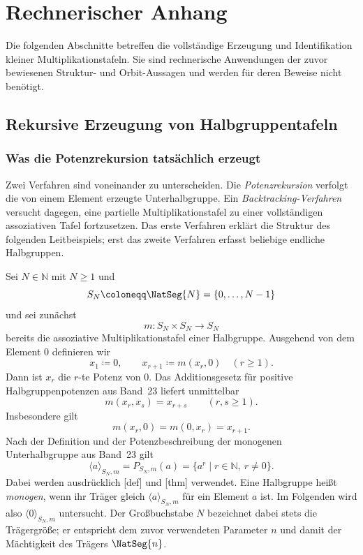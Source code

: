\documentclass[main.tex]{subfiles}
\begin{document}
\chapter{Rechnerischer Anhang}

Die folgenden Abschnitte betreffen die vollständige Erzeugung und
Identifikation kleiner Multiplikationstafeln.  Sie sind rechnerische
Anwendungen der zuvor bewiesenen Struktur- und Orbit-Aussagen und werden
für deren Beweise nicht benötigt.

\section{Rekursive Erzeugung von Halbgruppentafeln}

\subsection{Was die Potenzrekursion tatsächlich erzeugt}

Zwei Verfahren sind voneinander zu unterscheiden.  Die
\emph{Potenzrekursion} verfolgt die von einem Element erzeugte
Unterhalbgruppe.  Ein \emph{Backtracking-Verfahren} versucht dagegen, eine
partielle Multiplikationstafel zu einer vollständigen assoziativen Tafel
fortzusetzen.  Das erste Verfahren erklärt die Struktur des folgenden
Leitbeispiels; erst das zweite Verfahren erfasst beliebige endliche
Halbgruppen.

Sei \(N\in\mathbb N\) mit \(N\geq1\) und
\[
  S_N\coloneqq\NatSeg{N}=\{0,\ldots,N-1\}
\]
und sei zunächst
\[
  m\colon S_N\times S_N\to S_N
\]
bereits die assoziative Multiplikationstafel einer Halbgruppe.  Ausgehend von
dem Element \(0\) definieren wir
\[
  x_1\coloneqq0,
  \qquad
  x_{r+1}\coloneqq m(x_r,0)
  \quad(r\geq1).
\]
Dann ist \(x_r\) die \(r\)-te Potenz von \(0\).  Das Additionsgesetz für
positive Halbgruppenpotenzen aus Band~23 liefert unmittelbar
\[
  \boxed{m(x_r,x_s)=x_{r+s}}
  \qquad(r,s\geq1).
\]
Insbesondere gilt
\[
  m(x_r,0)=m(0,x_r)=x_{r+1}.
\]
Nach der Definition und der Potenzbeschreibung der monogenen
Unterhalbgruppe aus Band~23 gilt
\[
  \langle a\rangle_{S_N,m}
  =P_{S_N,m}(a)
  =\{a^r\mid r\in\mathbb N,\ r\neq0\}.
\]
Dabei werden ausdrücklich
[def] und
[thm] verwendet.  Eine
Halbgruppe heißt \emph{monogen}, wenn ihr Träger gleich
\(\langle a\rangle_{S_N,m}\) für ein Element \(a\) ist.  Im Folgenden wird
also \(\langle0\rangle_{S_N,m}\) untersucht.  Der Großbuchstabe \(N\) bezeichnet dabei
stets die Trägergröße; er entspricht dem zuvor verwendeten Parameter \(n\)
und damit der Mächtigkeit des Trägers \(\NatSeg{n}\).
\end{document}
